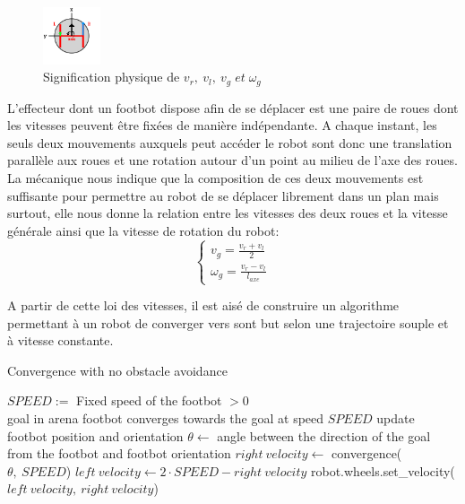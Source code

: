 \documentclass[a4paper,12pt]{report}
\begin{document}
\begin{figure}
  \vspace{-30pt}
  \begin{center}
    \includegraphics[width=0.15\textwidth]{robotWheels.png}
  \end{center}
  \caption{Signification physique de \(v_r,\: v_l,\: v_g \; et \; \omega_g \) \cite{argosSite1}}
\end{figure}
L'effecteur dont un footbot dispose afin de se déplacer est une paire de roues dont les vitesses peuvent être fixées de manière indépendante. A chaque instant, les seuls deux mouvements auxquels peut accéder le robot sont donc une translation parallèle aux roues et une rotation autour d'un point au milieu de l'axe des roues. La mécanique \cite{meca} nous indique que la composition de ces deux mouvements est suffisante pour permettre au robot de se déplacer librement dans un plan mais surtout, elle nous donne la relation entre les vitesses des deux roues et la vitesse générale ainsi que la vitesse de rotation du robot:
\begin{equation}
\begin{cases}
v_g=\frac{v_r+v_l}{2}\\
\omega_g=\frac{v_r-v_l}{l_{axe}}
\end{cases}  
\end{equation}

A partir de cette loi des vitesses, il est aisé de construire un algorithme permettant à un robot de converger vers sont but selon une trajectoire souple et à vitesse constante.
\begin{algorithm}                    
\caption{Convergence with no obstacle avoidance}
\label{simpleConvergence}
\begin{algorithmic}[1]
  \REQUIRE \(SPEED :=\) Fixed speed of the footbot \(> 0\)\\goal in arena
  \ENSURE footbot converges towards the goal at speed \(SPEED\)
    \STATE update footbot position and orientation
    \STATE \( \theta \leftarrow\) angle between the direction of the goal from the footbot and footbot orientation
    \STATE \( right\:velocity \leftarrow\) convergence(\(\theta,\:SPEED\))
    \STATE \( left\:velocity \leftarrow 2\cdot SPEED-right\:velocity\) 
    \STATE robot.wheels.set\_velocity(\(left\:velocity,\:right\:velocity\))
  \ENDWHILE
\end{algorithmic}
\end{algorithm}
\end{document}
